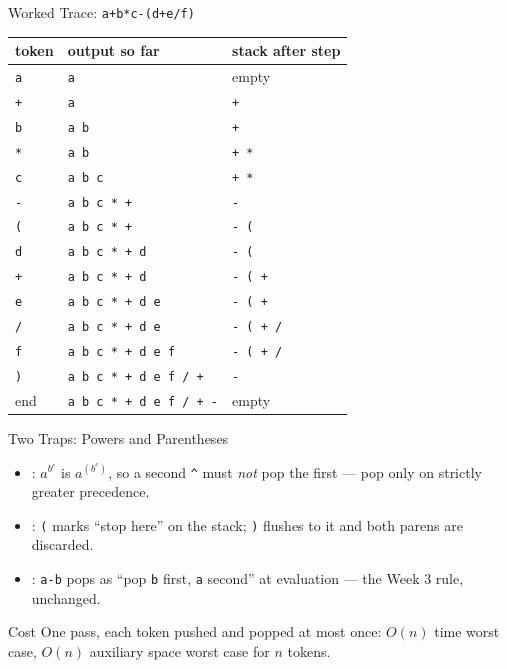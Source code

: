 \documentclass[aspectratio=169]{beamer}
\begin{document}
\begin{frame}{Worked Trace: \texttt{a+b*c-(d+e/f)}}
  \begin{center}
  {\footnotesize
  \begin{tabular}{lll}
    \toprule
    \textbf{token} & \textbf{output so far} & \textbf{stack after step} \\
    \midrule
    \texttt{a} & \texttt{a} & empty \\
    \texttt{+} & \texttt{a} & \texttt{+} \\
    \texttt{b} & \texttt{a b} & \texttt{+} \\
    \texttt{*} & \texttt{a b} & \texttt{+ *} \\
    \texttt{c} & \texttt{a b c} & \texttt{+ *} \\
    \texttt{-} & \texttt{a b c * +} & \texttt{-} \\
    \texttt{(} & \texttt{a b c * +} & \texttt{- (} \\
    \texttt{d} & \texttt{a b c * + d} & \texttt{- (} \\
    \texttt{+} & \texttt{a b c * + d} & \texttt{- ( +} \\
    \texttt{e} & \texttt{a b c * + d e} & \texttt{- ( +} \\
    \texttt{/} & \texttt{a b c * + d e} & \texttt{- ( + /} \\
    \texttt{f} & \texttt{a b c * + d e f} & \texttt{- ( + /} \\
    \texttt{)} & \texttt{a b c * + d e f / +} & \texttt{-} \\
    end & \texttt{a b c * + d e f / + -} & empty \\
    \bottomrule
  \end{tabular}}
  \end{center}
\end{frame}

\begin{frame}{Two Traps: Powers and Parentheses}
  \begin{itemize}
    \item {}: $a^{b^{c}}$ is $a^{(b^{c})}$, so a
      second \texttt{\^{}} must \emph{not} pop the first --- pop only on
      strictly greater precedence.
    \item {}: \texttt{(} marks ``stop here'' on
      the stack; \texttt{)} flushes to it and both parens are discarded.
    \item {}: \texttt{a-b} pops as ``pop \texttt{b}
      first, \texttt{a} second'' at evaluation --- the Week 3 rule, unchanged.
  \end{itemize}
  \begin{exampleblock}{Cost}
    One pass, each token pushed and popped at most once: $O(n)$ time worst
    case, $O(n)$ auxiliary space worst case for $n$ tokens.
  \end{exampleblock}
\end{frame}
\end{document}
